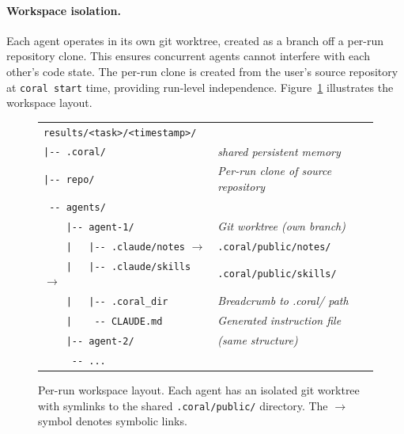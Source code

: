 \paragraph{Workspace isolation.} Each agent operates in its own git worktree, created as a branch off a per-run repository clone. This ensures concurrent agents cannot interfere with each other's code state. The per-run clone is created from the user's source repository at \texttt{coral start} time, providing run-level independence. Figure~\ref{fig:workspace_layout} illustrates the workspace layout.

\begin{figure}[t]
\centering
\begin{promptbox}
\ttfamily\scriptsize
\begin{tabular}{@{}l@{\quad}l@{}}
\texttt{results/\textrm{\textless}task\textrm{\textgreater}/\textrm{\textless}timestamp\textrm{\textgreater}/} & \\
\texttt{|{-}{-} .coral/} & \textit{shared persistent memory} \\
\texttt{|{-}{-} repo/} & \textit{Per-run clone of source repository} \\
\texttt{~{-}{-} agents/} & \\
\texttt{~~~~|{-}{-} agent-1/} & \textit{Git worktree (own branch)} \\
\texttt{~~~~|~~~|{-}{-} .claude/notes} $\to$ & \texttt{.coral/public/notes/} \\
\texttt{~~~~|~~~|{-}{-} .claude/skills} $\to$ & \texttt{.coral/public/skills/} \\
\texttt{~~~~|~~~|{-}{-} .coral\_dir} & \textit{Breadcrumb to .coral/ path} \\
\texttt{~~~~|~~~~{-}{-} CLAUDE.md} & \textit{Generated instruction file} \\
\texttt{~~~~|{-}{-} agent-2/} & \textit{(same structure)} \\
\texttt{~~~~~{-}{-} ...} & \\
\end{tabular}
\end{promptbox}
\caption{Per-run workspace layout. Each agent has an isolated git worktree with symlinks to the shared \texttt{.coral/public/} directory. The $\to$ symbol denotes symbolic links.}
\label{fig:workspace_layout}
\end{figure}

